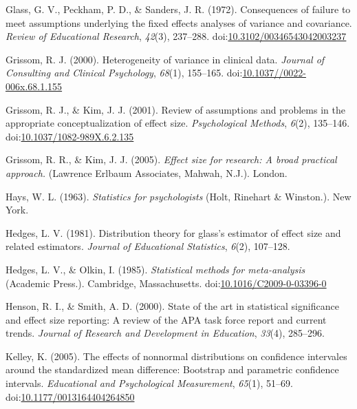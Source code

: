 \documentclass[
  man,floatsintext]{apa6}
\begin{document}
\leavevmode\hypertarget{ref-Glass_et_al_1972}{}%
Glass, G. V., Peckham, P. D., \& Sanders, J. R. (1972). Consequences of failure to meet assumptions underlying the fixed effects analyses of variance and covariance. \emph{Review of Educational Research}, \emph{42}(3), 237--288. doi:\href{https://doi.org/10.3102/00346543042003237}{10.3102/00346543042003237}

\leavevmode\hypertarget{ref-Grissom_2000}{}%
Grissom, R. J. (2000). Heterogeneity of variance in clinical data. \emph{Journal of Consulting and Clinical Psychology}, \emph{68}(1), 155--165. doi:\href{https://doi.org/10.1037//0022-006x.68.1.155}{10.1037//0022-006x.68.1.155}

\leavevmode\hypertarget{ref-Grissom_Kim_2001}{}%
Grissom, R. J., \& Kim, J. J. (2001). Review of assumptions and problems in the appropriate conceptualization of effect size. \emph{Psychological Methods}, \emph{6}(2), 135--146. doi:\href{https://doi.org/10.1037/1082-989X.6.2.135}{10.1037/1082-989X.6.2.135}

\leavevmode\hypertarget{ref-Grissom_and_kim_2005}{}%
Grissom, R. R., \& Kim, J. J. (2005). \emph{Effect size for research: A broad practical approach.} (Lawrence Erlbaum Associates, Mahwah, N.J.). London.

\leavevmode\hypertarget{ref-Hays_1963}{}%
Hays, W. L. (1963). \emph{Statistics for psychologists} (Holt, Rinehart \& Winston.). New York.

\leavevmode\hypertarget{ref-Hedges_1981}{}%
Hedges, L. V. (1981). Distribution theory for glass's estimator of effect size and related estimators. \emph{Journal of Educational Statistics}, \emph{6}(2), 107--128.

\leavevmode\hypertarget{ref-Hedges_Olkin_1985}{}%
Hedges, L. V., \& Olkin, I. (1985). \emph{Statistical methods for meta-analysis} (Academic Press.). Cambridge, Massachusetts. doi:\href{https://doi.org/10.1016/C2009-0-03396-0}{10.1016/C2009-0-03396-0}

\leavevmode\hypertarget{ref-Henson_Smith_2000}{}%
Henson, R. I., \& Smith, A. D. (2000). State of the art in statistical significance and effect size reporting: A review of the APA task force report and current trends. \emph{Journal of Research and Development in Education}, \emph{33}(4), 285--296.

\leavevmode\hypertarget{ref-Kelley_2005}{}%
Kelley, K. (2005). The effects of nonnormal distributions on confidence intervales around the standardized mean difference: Bootstrap and parametric confidence intervals. \emph{Educational and Psychological Measurement}, \emph{65}(1), 51--69. doi:\href{https://doi.org/10.1177/0013164404264850}{10.1177/0013164404264850}
\end{document}
